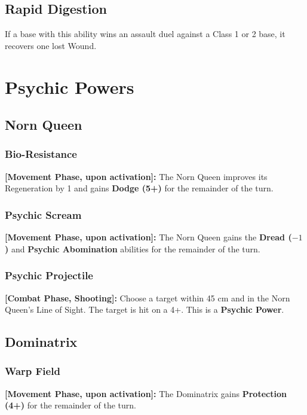 \subsection{Rapid Digestion}

If a base with this ability wins an assault duel against a Class 1 or 2 base, it recovers one lost Wound.

\section{Psychic Powers}

\subsection{Norn Queen}

\subsubsection{Bio-Resistance}

\textbf{[Movement Phase, upon activation]:} The Norn Queen improves its Regeneration by 1 and gains \textbf{Dodge (5+)} for the remainder of the turn.

\subsubsection{Psychic Scream}

\textbf{[Movement Phase, upon activation]:} The Norn Queen gains the \textbf{Dread ($-1$)} and \textbf{Psychic Abomination} abilities for the remainder of the turn.

\subsubsection{Psychic Projectile}

\textbf{[Combat Phase, Shooting]:} Choose a target within 45 cm and in the Norn Queen's Line of Sight. The target is hit on a 4+. This is a \textbf{Psychic Power}.

\subsection{Dominatrix}

\subsubsection{Warp Field}

\textbf{[Movement Phase, upon activation]:} The Dominatrix gains \textbf{Protection (4+)} for the remainder of the turn.

